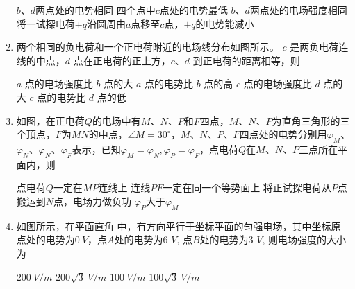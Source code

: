 \begin{enumerate}[leftmargin=0em]
\fourchoices
{$ b $、$ d $两点处的电势相同}
{四个点中$ c $点处的电势最低}
{$ b $、$ d $两点处的电场强度相同}
{将一试探电荷$ +q $沿圆周由$ a $点移至$ c $点，$ +q $的电势能减小}





\item
{}
两个相同的负电荷和一个正电荷附近的电场线分布如图所示。 $ c $ 是两负电荷连线的中点，$ d $ 点在正电荷的正上方，$ c $、$ d $ 到正电荷的距离相等，则  
\begin{figure}[h!]
\centering

\end{figure}


\fourchoices
{$a $ 点的电场强度比 $ b $ 点的大}
{$a $ 点的电势比 $ b $ 点的高}
{$c $ 点的电场强度比 $ d $ 点的大}
{$c $ 点的电势比 $ d $ 点的低}




\item
{}
如图，在正电荷$ Q $的电场中有$ M $、$ N $、$ P $和$ F $四点，$ M $、$ N $、$ P $为直角三角形的三个顶点，$ F $为$ MN $的中点，$\angle M = 30 ^ { \circ }$，$ M $、$ N $、$ P $、$ F $四点处的电势分别用$\varphi _ { M }$、$\varphi _ { N }$、$\varphi _ { N }$、$\varphi _ { F }$表示，已知$\varphi _ { M } = \varphi _ { N } , \varphi _ { P } = \varphi _ { F }$，点电荷$ Q $在$ M $、$ N $、$ P $三点所在平面内，则  
\begin{figure}[h!]
\centering

\end{figure}


\fourchoices
{点电荷$ Q $一定在$ MP $连线上}
{连线$ PF $一定在同一个等势面上}
{将正试探电荷从$ P $点搬运到$ N $点，电场力做负功}
{$\varphi _ { P }$大于$\varphi _ { M }$}




\item
{}
如图所示，在平面直角 中，有方向平行于坐标平面的匀强电场，其中坐标原点处的电势为$ 0\ V $，点$ A $处的电势为$ 6 $ $ V $, 点$ B $处的电势为$ 3 $ $ V $, 则电场强度的大小为  
\begin{figure}[h!]
\centering

\end{figure}
\fourchoices
{$ 200\ V/m $}
{$ 200\sqrt{3}\ V/m $}
{$ 100\ V/m $}
{$ 100\sqrt{3}\ V/m $}






\end{enumerate}
